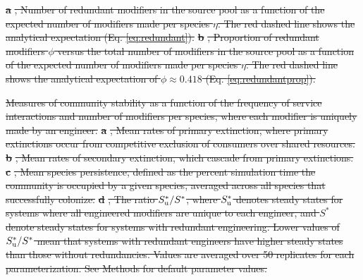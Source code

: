\documentclass[twocolumn,preprintnumbers,amsmath,amssymb,superscriptaddress,linenumbers]{revtex4-1}
\providecommand{\DIFdel}[1]{{\protect\color{red}\sout{#1}}}                      %
\providecommand{\DIFdelFL}[1]{\DIFdel{#1}} %
\begin{document}
{%
\textbf{\DIFdelFL{a}}%
\DIFdelFL{, Number of redundant modifiers in the source pool as a function of the expected number of modifiers made per species $\eta$.
The red dashed line shows the analytical expectation (Eq. \ref{eq:redundant}).
}\textbf{\DIFdelFL{b}}%
\DIFdelFL{, Proportion of redundant modifiers $\phi$ versus the total number of modifiers in the source pool as a function of the expected number of modifiers made per species $\eta$.
The red dashed line shows the analytical expectation of $\phi \approx 0.418$ (Eq. \ref{eq:redundantprop}).
}}

{%
\DIFdelFL{Measures of community stability as a function of the frequency of service interactions and number of modifiers per species, where each modifier is uniquely made by an engineer.
}\textbf{\DIFdelFL{a}}%
\DIFdelFL{, Mean rates of primary extinction, where primary extinctions occur from competitive exclusion of consumers over shared resources.
}\textbf{\DIFdelFL{b}}%
\DIFdelFL{, Mean rates of secondary extinction, which cascade from primary extinctions.
}\textbf{\DIFdelFL{c}}%
\DIFdelFL{, Mean species persistence, defined as the percent simulation time the community is occupied by a given species, averaged across all species that successfully colonize.
}\textbf{\DIFdelFL{d}}%
\DIFdelFL{, The ratio $S^*_{\rm u}/S^*$, where $S^*_{\rm u}$ denotes steady states for systems where all engineered modifiers are unique to each engineer, and $S^*$ denote steady states for systems with redundant engineering. Lower values of $S^*_{\rm u}/S^*$ mean that systems with redundant engineers have higher steady states than those without redundancies.
Values are averaged over 50 replicates for each parameterization.
See Methods for default parameter values.
}}
\end{document}
